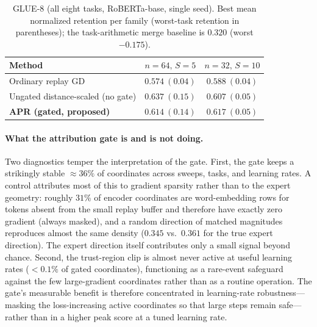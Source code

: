 \documentclass[11pt]{article}
\begin{document}
\begin{table}[t]
\centering
\caption{GLUE-8 (all eight tasks, RoBERTa-base, single seed). Best mean normalized retention per family (worst-task retention in parentheses); the task-arithmetic merge baseline is $0.320$ (worst $-0.175$).}
\label{tab:glue8}
\begin{tabular}{lcc}
\toprule
Method & $n{=}64,\,S{=}5$ & $n{=}32,\,S{=}10$ \\
\midrule
Ordinary replay GD & $0.574\ (0.04)$ & $0.588\ (0.04)$ \\
Ungated distance-scaled (no gate) & $\mathbf{0.637}\ (0.15)$ & $0.607\ (0.05)$ \\
\textbf{APR (gated, proposed)} & $0.614\ (0.14)$ & $\mathbf{0.617}\ (0.05)$ \\
\bottomrule
\end{tabular}
\end{table}

\paragraph{What the attribution gate is and is not doing.}
Two diagnostics temper the interpretation of the gate. First, the gate keeps a strikingly stable $\approx 36\%$ of coordinates across sweeps, tasks, and learning rates. A control attributes most of this to gradient sparsity rather than to the expert geometry: roughly $31\%$ of encoder coordinates are word-embedding rows for tokens absent from the small replay buffer and therefore have exactly zero gradient (always masked), and a random direction of matched magnitudes reproduces almost the same density ($0.345$ vs.\ $0.361$ for the true expert direction). The expert direction itself contributes only a small signal beyond chance. Second, the trust-region clip is almost never active at useful learning rates ($<0.1\%$ of gated coordinates), functioning as a rare-event safeguard against the few large-gradient coordinates rather than as a routine operation. The gate's measurable benefit is therefore concentrated in learning-rate robustness---masking the loss-increasing active coordinates so that large steps remain safe---rather than in a higher peak score at a tuned learning rate.
\end{document}
